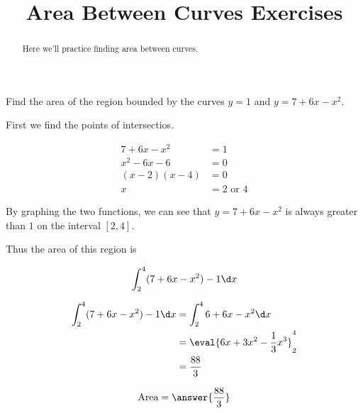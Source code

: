 \documentclass[handout]{ximera}
\title[Exercises:]{Area Between Curves Exercises}
\begin{document}
\begin{abstract}
  Here we'll practice finding area between curves.
\end{abstract}
\maketitle

\begin{exercise}
Find the area of the region bounded by the curves $y = 1$ and $y =7+6x-x^2$.

\begin{hint}
	First we find the points of intersectios.
	
	\begin{align*}
	7+6x-x^2 &= 1\\
	x^2-6x-6 &=0\\
	(x-2)(x-4) &=0\\
	x &= 2 \textrm{ or  }4
	\end{align*}
\end{hint}

\begin{hint}
	By graphing the two functions, we can see that $y =7+6x-x^2$ is always greater than $1$ on the interval $[2,4]$.
\end{hint}

\begin{hint}
	Thus the area of this region is

	\[
	\int_2^4 (7+6x-x^2) - 1 \d x
	\]
\end{hint}

\begin{hint}
	\begin{align*}
		\int_2^4 (7+6x-x^2) - 1 \d x &= \int_2^4 6+6x-x^2 \d x\\
		&= \eval{6x+3x^2-\frac{1}{3}x^3}_2^4\\
		&= \frac{88}{3}
	\end{align*}
\end{hint}

\begin{prompt}
	\[
		\textrm{Area} = \answer{\frac{88}{3}}
	\]
\end{prompt}

\end{exercise}
\end{document}
